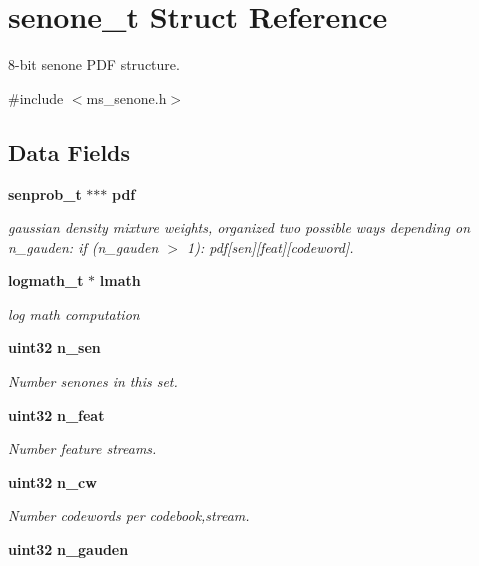 \section{senone\-\_\-t \-Struct \-Reference}
\label{structsenone__t}


8-\/bit senone \-P\-D\-F structure.  




{\ttfamily \#include $<$ms\-\_\-senone.\-h$>$}

\subsection*{\-Data \-Fields}
\begin{DoxyCompactItemize}
\item 
{\bf senprob\-\_\-t} $\ast$$\ast$$\ast$ {\bf pdf}
\begin{DoxyCompactList}\small\item\em gaussian density mixture weights, organized two possible ways depending on n\-\_\-gauden\-: if (n\-\_\-gauden $>$ 1)\-: pdf[sen][feat][codeword]. \end{DoxyCompactList}\item 
{\bf logmath\-\_\-t} $\ast$ {\bf lmath}\label{structsenone__t_aa8621fab8c5b7a13493cae5549a5e0de}

\begin{DoxyCompactList}\small\item\em log math computation \end{DoxyCompactList}\item 
{\bf uint32} {\bf n\-\_\-sen}\label{structsenone__t_a769aa6d2fc16b33c0b9a1cbf31592422}

\begin{DoxyCompactList}\small\item\em \-Number senones in this set. \end{DoxyCompactList}\item 
{\bf uint32} {\bf n\-\_\-feat}\label{structsenone__t_a6a0aa50b8ff66e06f7305d1c8e4a17be}

\begin{DoxyCompactList}\small\item\em \-Number feature streams. \end{DoxyCompactList}\item 
{\bf uint32} {\bf n\-\_\-cw}\label{structsenone__t_a3c382a37dc9cb650d910bb881c52b336}

\begin{DoxyCompactList}\small\item\em \-Number codewords per codebook,stream. \end{DoxyCompactList}\item 
{\bf uint32} {\bf n\-\_\-gauden}\label{structsenone__t_a71cf7b41b2334216944380296c03c99a}


\end{DoxyCompactItemize}
